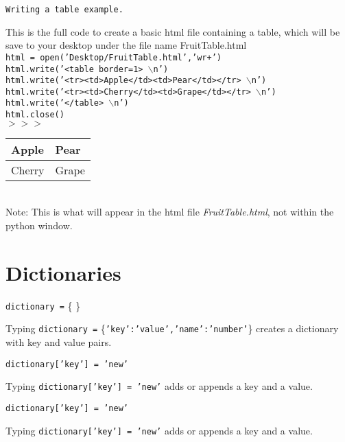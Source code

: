 \noindent \texttt{Writing a table example.}
\begin{myindentpar}{1.4cm}
\vspace*{-1ex}
This is the full code to create a basic html file containing a table, which will be save to your desktop under the file name FruitTable.html\\
\texttt{html = {\color{purple}open}('Desktop/FruitTable.html','wr+')\\
html.write('<table border=1> $\backslash$n')\\
html.write('<tr><td>Apple</td><td>Pear</td></tr> $\backslash$n')\\
html.write('<tr><td>Cherry</td><td>Grape</td></tr> $\backslash$n')\\
html.write('</table> $\backslash$n')\\
html.close()}\\
$>>>$ \begin{tabular}{|l|l|}
\hline
Apple & Pear \\ \hline
Cherry & Grape \\ \hline
\end{tabular}\\ 
{\color{red} Note: This is what will appear in the html file \textit{FruitTable.html}, not within the python window.}
\end{myindentpar}

\section*{Dictionaries}
\noindent \texttt{dictionary =} \{ \}
\begin{myindentpar}{1.4cm}
\vspace*{-1ex}
Typing \texttt{dictionary =} \{{\tt 'key':'value','name':'number'}\} creates a dictionary with key and value pairs.
\end{myindentpar}
\noindent \texttt{dictionary['key'] = 'new'}
\begin{myindentpar}{1.4cm}
\vspace*{-1ex}
Typing \texttt{dictionary['key'] = 'new'} adds or appends a key and a value.
\end{myindentpar}

\noindent \texttt{dictionary['key'] = 'new'}
\begin{myindentpar}{1.4cm}
\vspace*{-1ex}
Typing \texttt{dictionary['key'] = 'new'} adds or appends a key and a value.
\end{myindentpar}

